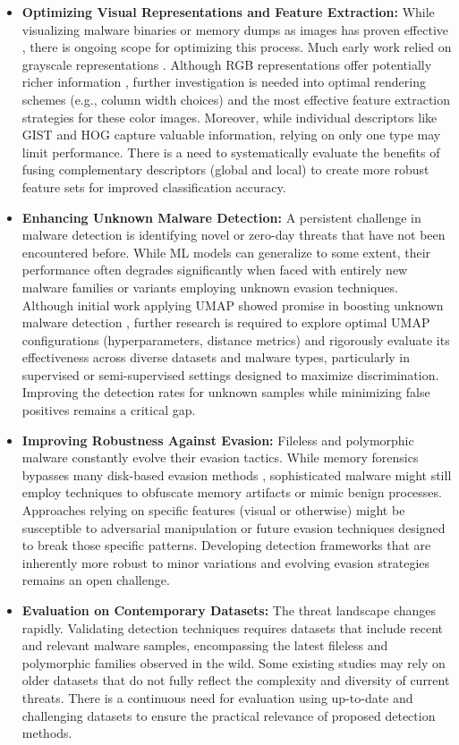 \begin{itemize}
    \item \textbf{Optimizing Visual Representations and Feature Extraction:} While visualizing malware binaries or memory dumps as images has proven effective \cite{nataraj2011malware, bozkir2021catch}, there is ongoing scope for optimizing this process. Much early work relied on grayscale representations \cite{nataraj2011malware, dai2018malware}. Although RGB representations offer potentially richer information \cite{bozkir2021catch}, further investigation is needed into optimal rendering schemes (e.g., column width choices) and the most effective feature extraction strategies for these color images. Moreover, while individual descriptors like GIST and HOG capture valuable information, relying on only one type may limit performance. There is a need to systematically evaluate the benefits of fusing complementary descriptors (global and local) to create more robust feature sets for improved classification accuracy.
    \item \textbf{Enhancing Unknown Malware Detection:} A persistent challenge in malware detection is identifying novel or zero-day threats that have not been encountered before. While ML models can generalize to some extent, their performance often degrades significantly when faced with entirely new malware families or variants employing unknown evasion techniques. Although initial work applying UMAP showed promise in boosting unknown malware detection \cite{bozkir2021catch}, further research is required to explore optimal UMAP configurations (hyperparameters, distance metrics) and rigorously evaluate its effectiveness across diverse datasets and malware types, particularly in supervised or semi-supervised settings designed to maximize discrimination. Improving the detection rates for unknown samples while minimizing false positives remains a critical gap.
    \item \textbf{Improving Robustness Against Evasion:} Fileless and polymorphic malware constantly evolve their evasion tactics. While memory forensics bypasses many disk-based evasion methods \cite{kara2022fileless}, sophisticated malware might still employ techniques to obfuscate memory artifacts or mimic benign processes. Approaches relying on specific features (visual or otherwise) might be susceptible to adversarial manipulation or future evasion techniques designed to break those specific patterns. Developing detection frameworks that are inherently more robust to minor variations and evolving evasion strategies remains an open challenge.
    \item \textbf{Evaluation on Contemporary Datasets:} The threat landscape changes rapidly. Validating detection techniques requires datasets that include recent and relevant malware samples, encompassing the latest fileless and polymorphic families observed in the wild. Some existing studies may rely on older datasets that do not fully reflect the complexity and diversity of current threats. There is a continuous need for evaluation using up-to-date and challenging datasets to ensure the practical relevance of proposed detection methods.
\end{itemize}

